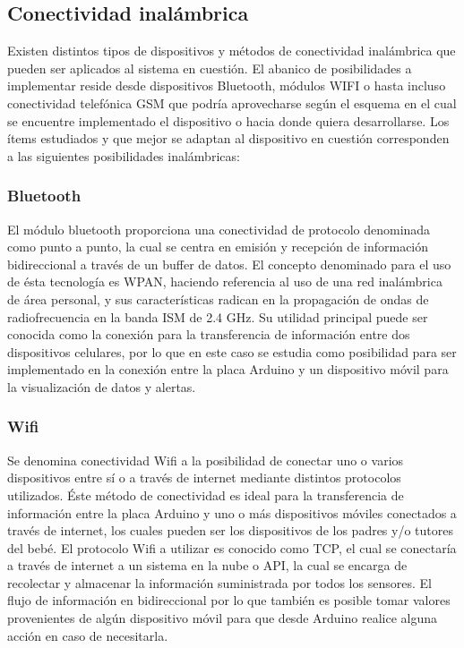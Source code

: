 \documentclass{IEEEtran}
\begin{document}
		\subsection{Conectividad inalámbrica}

			Existen distintos tipos de dispositivos y métodos de conectividad inalámbrica que pueden ser aplicados al sistema en cuestión. El abanico de posibilidades a implementar reside desde dispositivos Bluetooth, módulos WIFI o hasta incluso conectividad telefónica GSM que podría aprovecharse según el esquema en el cual se encuentre implementado el dispositivo o hacia donde quiera desarrollarse. Los ítems estudiados y que mejor se adaptan al dispositivo en cuestión corresponden a las siguientes posibilidades inalámbricas:

			\subsubsection{Bluetooth}

				El módulo bluetooth proporciona una conectividad de protocolo denominada como punto a punto, la cual se centra en emisión y recepción de información bidireccional a través de un buffer de datos.
				El concepto denominado para el uso de ésta tecnología es WPAN, haciendo referencia al uso de una red inalámbrica de área personal, y sus características radican en la propagación de ondas de radiofrecuencia en la banda ISM de 2.4 GHz.
				Su utilidad principal puede ser conocida como la conexión para la transferencia de información entre dos dispositivos celulares, por lo que en este caso se estudia como posibilidad para ser implementado en la conexión entre la placa Arduino y un dispositivo móvil para la visualización de datos y alertas.

			\subsubsection{Wifi}

				Se denomina conectividad Wifi a la posibilidad de conectar uno o varios dispositivos entre sí o a través de internet mediante distintos protocolos utilizados. Éste método de conectividad es ideal para la transferencia de información entre la placa Arduino y uno o más dispositivos móviles conectados a través de internet, los cuales pueden ser los dispositivos de los padres y/o tutores del bebé.
				El protocolo Wifi a utilizar es conocido como TCP, el cual se conectaría a través de internet a un sistema en la nube o API, la cual se encarga de recolectar y almacenar la información suministrada por todos los sensores. El flujo de información en bidireccional por lo que también es posible tomar valores provenientes de algún dispositivo móvil para que desde Arduino realice alguna acción en caso de necesitarla.
\end{document}
